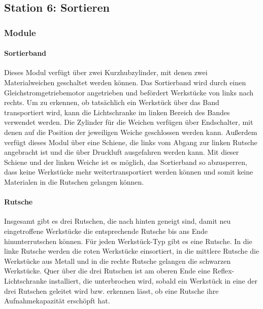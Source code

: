 \documentclass[11pt,a4paper,ngerman]{article}
\begin{document}
\subsection{Station 6: Sortieren}

\subsubsection{Module}

\paragraph{Sortierband}
Dieses Modul verfügt über zwei Kurzhubzylinder, mit denen zwei Materialweichen geschaltet werden können. Das Sortierband wird durch einen Gleichstromgetriebemotor angetrieben und befördert Werkstücke von links nach rechts. Um zu erkennen, ob tatsächlich ein Werkstück über das Band transportiert wird, kann die Lichtschranke im linken Bereich des Bandes verwendet werden. Die Zylinder für die Weichen verfügen über Endschalter, mit denen auf die Position der jeweiligen Weiche geschlossen werden kann. Außerdem verfügt dieses Modul über eine Schiene, die links vom Abgang zur linken Rutsche angebracht ist und die über Druckluft ausgefahren werden kann. Mit dieser Schiene und der linken Weiche ist es möglich, das Sortierband so abzusperren, dass keine Werkstücke mehr weitertransportiert werden können und somit keine Materialen in die Rutschen gelangen können.

\paragraph{Rutsche}
Insgesamt gibt es drei Rutschen, die nach hinten geneigt sind, damit neu eingetroffene Werkstücke die entsprechende Rutsche bis ans Ende hinunterrutschen können. Für jeden Werkstück-Typ gibt es eine Rutsche. In die linke Rutsche werden die roten Werkstücke einsortiert, in die mittlere Rutsche die Werkstücke aus Metall und in die rechte Rutsche gelangen die schwarzen Werkstücke. Quer über die drei Rutschen ist am oberen Ende eine Reflex-Lichtschranke installiert, die unterbrochen wird, sobald ein Werkstück in eine der drei Rutschen geleitet wird bzw. erkennen lässt, ob eine Rutsche ihre Aufnahmekapazität erschöpft hat.
\end{document}
